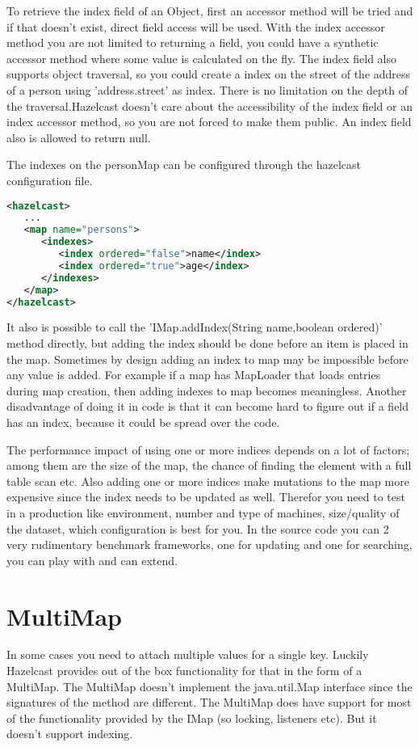 To retrieve the index field of an Object, first an accessor method will be tried and if that doesn't exist, direct field access will be used. With the index accessor method you are not limited to returning a field, you could have a synthetic accessor method where some value is calculated on the fly. The index field also supports object traversal, so you could create a index on the street of the address of a person using 'address.street' as index. There is no limitation on the depth of the traversal.Hazelcast doesn't care about the accessibility of the index field or an index accessor method, so you are not forced to make them public. An index field also is allowed to return null.

The indexes on the personMap can be configured through the hazelcast configuration file. 
\begin{lstlisting}[language=xml]
<hazelcast>
   ...
   <map name="persons">
      <indexes>
         <index ordered="false">name</index>
         <index ordered="true">age</index>
      </indexes>
   </map>
</hazelcast>
\end{lstlisting}
It also is possible to call the 'IMap.addIndex(String name,boolean ordered)' method directly, but adding the index should be done before an item is placed in the map. Sometimes by design adding an index to map may be impossible before any value is added. For example if a map has MapLoader that loads entries during map creation, then adding indexes to map becomes meaningless. Another disadvantage of doing it in code is that it can become hard to figure out if a field has an index, because it could be spread over the code.

The performance impact of using one or more indices depends on a lot of factors; among them are the size of the  map, the chance of finding the element with a full table scan etc. Also adding one or more indices make mutations to the map more expensive since the index needs to be updated as well. Therefor you need to test in a production like environment, number and type of machines, size/quality of the dataset, which configuration is best for you. In the source code you can 2 very rudimentary benchmark frameworks, one for updating and one for searching, you can play with and can extend. 

\section{MultiMap}
In some cases you need to attach multiple values for a single key. Luckily Hazelcast provides out of the box functionality for that in the form of a MultiMap. The MultiMap doesn't implement the java.util.Map interface since the signatures of the method are different. The MultiMap does have support for most of the functionality provided by the IMap (so locking, listeners etc). But it doesn't support indexing.

